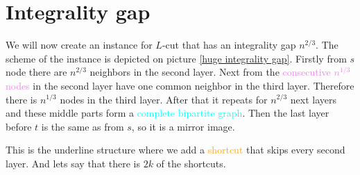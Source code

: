\section{Integrality gap}

We will now create an instance for $L$-cut that has an integrality gap $n^{2/3}$. The scheme of the instance is depicted on picture \ref{huge integrality gap}. Firstly from $s$ node there are $n^{2/3}$ neighbors in the second layer. Next from the \textcolor{violet}{consecutive $n^{1/3}$ nodes} in the second layer have one common neighbor in the third layer. Therefore there is $n^{1/3}$ nodes in the third layer. After that it repeats for $n^{2/3}$ next layers and these middle parts form a \textcolor{cyan}{complete bipartite graph}. Then the last layer before $t$ is the same as from $s$, so it is a mirror image.

This is the underline structure where we add a \textcolor{orange}{shortcut} that skips every second layer. And lets say that there is $2k$ of the shortcuts.

